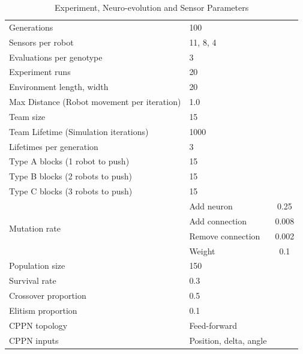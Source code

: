 \documentclass[conference]{IEEEtran}
\begin{document}
\begin{table}
	\renewcommand{\arraystretch}{1.30}
	\caption{Experiment, Neuro-evolution and Sensor Parameters}\label{tab:simParameters}
	\centering
	\begin{tabular}{llc}
		\hline
		Generations	                                           & 100	\\
		Sensors per robot                                      & 11, 8, 4 \\	
		Evaluations per genotype                               & 3  \\
		Experiment runs                                        & 20 \\
		Environment length, width                              & 20 \\
        Max Distance (Robot movement per iteration)            & 1.0 \\
        Team size                                              & 15 \\
        Team Lifetime (Simulation iterations)                  & 1000 \\	
        Lifetimes per generation                               & 3 \\
        Type A blocks (1 robot to push)                        & 15 \\
        Type B blocks (2 robots to push)                       & 15 \\
        Type C blocks (3 robots to push)                       & 15 \\
		\hline
		\multirow{4}{*}{Mutation rate} & Add neuron            & 0.25 \\
		& Add connection                                       & 0.008  \\
		& Remove connection                                    & 0.002 \\
		& Weight                                               & 0.1  \\
		Population size                                        & 150 \\
		Survival rate                                          & 0.3 \\
		Crossover proportion                                   & 0.5 \\
		Elitism proportion                                     & 0.1 \\
		CPPN topology                                          & Feed-forward           \\
		CPPN inputs                                            & Position, delta, angle \\

\end{tabular}
\end{table}
\end{document}
